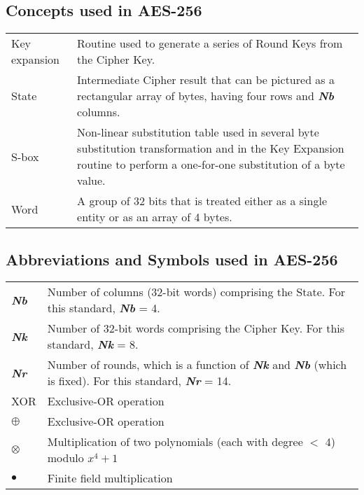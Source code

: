 \documentclass[a4paper, 10pt]{paper}
\begin{document}
\begin{multicols}{2}
            \subsection{Concepts used in AES-256}
                \begingroup
                    \setlength{\tabcolsep}{10pt} %
                    \renewcommand{\arraystretch}{2} %
                    \noindent
                    \begin{tabular}{m{2cm} m{5cm}}
                        Key expansion & Routine used to generate a series of Round Keys from the Cipher Key.\\
                        State & Intermediate Cipher result that can be pictured as a rectangular array
                        of bytes, having four rows and \textbf{\textit{Nb}} columns.\\
                        S-box & Non-linear substitution table used in several byte substitution transformation and in the Key Expansion routine to perform a one-for-one substitution of a byte value.\\
                        Word & A group of 32 bits that is treated either as a single entity or as an array of 4 bytes.\\
                    \end{tabular}
                \endgroup

            \subsection{Abbreviations and Symbols used in AES-256}
                \begingroup
                    \setlength{\tabcolsep}{5pt} %
                    \renewcommand{\arraystretch}{2} %
                    \noindent
                        \begin{tabular}{m{1cm} m{6.5cm}}
                            \textbf{\textit{Nb}} & Number of columns (32-bit words) comprising the State. For this
                            standard, \textbf{\textit{Nb}} = 4.\\
                            \textbf{\textit{Nk}} & Number of 32-bit words comprising the Cipher Key. For this standard, \textbf{\textit{Nk}} = 8.\\
                            \textbf{\textit{Nr}} & Number of rounds, which is a function of \textbf{\textit{Nk}} and \textbf{\textit{Nb}} (which is
                            fixed). For this standard, \textbf{\textit{Nr}} = 14.\\
                            XOR & Exclusive-OR operation\\
                            $\oplus$ & Exclusive-OR operation\\
                            $\otimes$ & Multiplication of two polynomials (each with degree $<$ 4) modulo $x^{4}+1$\\
                            $\bullet$ & Finite field multiplication\\
                        \end{tabular}
                \endgroup


\end{multicols}
\end{document}
